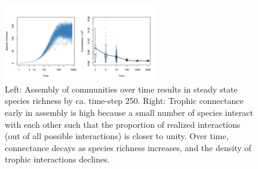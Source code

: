 \documentclass[twocolumn,preprintnumbers,amsmath,amssymb,superscriptaddress,linenumbers]{revtex4-1}
\newcommand{\rr}[1]{{\rm #1}}
\begin{document}
% 

% 



\begin{figure}[h!]
\centering
\includegraphics[width=0.6\textwidth]{fig_conn.pdf}
\caption{
Left: Assembly of communities over time results in steady state species richness by ca. time-step 250.
Right: Trophic connectance early in assembly is high because a small number of species interact with each other such that the proportion of realized interactions (out of all possible interactions) is closer to unity.
Over time, connectance decays as species richness increases, and the density of trophic interactions declines.
}
\label{fig:conn}
\end{figure}
\end{document}
